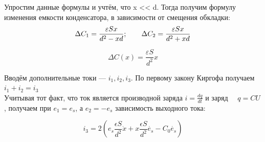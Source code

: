 Упростим данные формулы и учтём, что x << d. Тогда получим формулу изменения емкости конденсатора, в зависимости от смещения обкладки:
\begin{equation*}
	\Delta C_1=\frac{\varepsilon Sx}{d^2-xd}; \ \ \ \ \ \ 
	\Delta C_2=\frac{\varepsilon Sx}{d^2+xd} \\
\end{equation*}

\begin{equation}
	\Delta C\left(x\right)=\frac{\varepsilon S}{d^2}x
\end{equation}

\hspace{0.5cm}

Вводём дополнительные токи — $i_1, i_2, i_3$. По первому закону Киргофа \cite{bessonov_toe} получаем $i_1 + i_2 = i_3$ \\ 
Учитывая тот факт, что ток является производной заряда $i = \frac{dq}{dt}$ и заряд \ \ $q=CU$, получаем при $e_1=e_s$, а $e_2=-e_s$ зависимость выходного тока:

\begin{equation}
	i_{3} = 2 \left( e_{s} \frac{\epsilon S}{d^2} \dot{x} + x \frac{\epsilon S}{d^2} \dot{e_{s}} - C_{0}\dot{e_{s}} \right) 
\end{equation}

\newpage